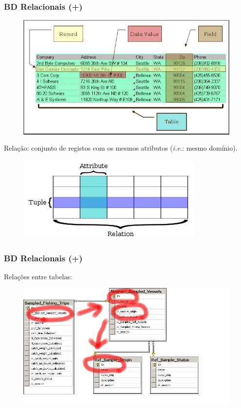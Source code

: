 \documentclass[hyperref={pdfpagelabels=true}]{beamer}
\begin{document}
\begin{frame}
\frametitle{BD Relacionais (+)}
  \begin{figure}
  \includegraphics[scale=0.3]{table.png}
  \end{figure}
Rela\c{c}\~{a}o: conjunto de registos com os mesmos atributos (\textit{i.e.}: mesmo dom\'{i}nio).\\
  \begin{figure}
  \includegraphics[scale=0.4]{350px-Relational_database_terms.png}
  \end{figure}
\end{frame}

\begin{frame}
\frametitle{BD Relacionais (+)}
Rela\c{c}\~{o}es entre tabelas:\\
\begin{figure}
\includegraphics[scale=0.5]{sample_status_originb}
\end{figure}
\end{frame}
\end{document}
